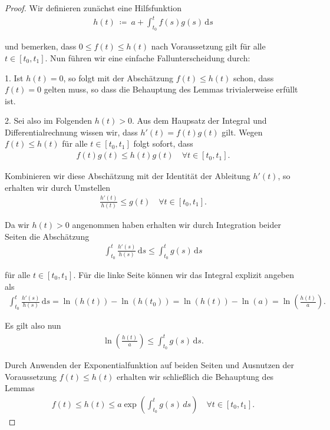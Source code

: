 \documentclass[letterpaper,10pt,english]{jupyterBook}
\begin{document}
\begin{proof}
 Wir definieren zunächst eine Hilfsfunktion
\begin{align*}
h(t) \ \coloneqq \ a + \int_{t_0}^t f(s)g(s)\, \mathrm{d}s
\end{align*}
\par
und bemerken, dass \(0 \leq f(t) \leq h(t)\) nach Voraussetzung gilt für alle \(t \in [t_0, t_1]\).
Nun führen wir eine einfache Fallunterscheidung durch:

\par
1. Ist \(h(t)=0\), so folgt mit der Abschätzung \(f(t) \leq h(t)\) schon, dass \(f(t) = 0\) gelten muss, so dass die Behauptung des Lemmas trivialerweise erfüllt ist.

\par
2. Sei also im Folgenden \(h(t) > 0\).
Aus dem Haupsatz der Integral  und Differentialrechnung wissen wir, dass \(h'(t) = f(t)g(t)\) gilt.
Wegen \(f(t) \leq h(t)\) für alle \(t \in [t_0, t_1]\) folgt sofort, dass
\begin{align*}
f(t)g(t) \leq h(t)g(t) \quad \forall t \in [t_0,t_1].
\end{align*}
\par
Kombinieren wir diese Abschätzung mit der Identität der Ableitung \(h'(t)\), so erhalten wir durch Umstellen
\begin{align*}
\frac{h'(t)}{h(t)} \leq g(t) \quad \forall t \in [t_0, t_1].
\end{align*}
\par
Da wir \(h(t) > 0\) angenommen haben erhalten wir durch Integration beider Seiten die Abschätzung
\begin{align*}
\int_{t_0}^t \frac{h'(s)}{h(s)} \, \mathrm{d}s \leq \int_{t_0}^t g(s) \, \mathrm{d}s\end{align*}
\par
für alle \(t \in [t_0, t_1]\).
Für die linke Seite können wir das Integral explizit angeben als
\begin{align*}
\int_{t_0}^t \frac{h'(s)}{h(s)} \, \mathrm{d}s = \ln(h(t)) - \ln(h(t_0)) = \ln(h(t)) - \ln(a) = \ln\left(\frac{h(t)}{a}\right).
\end{align*}
\par
Es gilt also nun
\begin{align*}
\ln \left(\frac{h(t)}{a}\right) \leq \int_{t_0}^t g(s)\, \mathrm{d}s.
\end{align*}
\par
Durch Anwenden der Exponentialfunktion auf beiden Seiten und Ausnutzen der Voraussetzung \(f(t) \leq h(t)\) erhalten wir schließlich die Behauptung des Lemmas
\begin{align*}
 f(t) \leq h(t)\leq a \exp{\left( \int_{t_0}^t g(s)\, ds \right)} \quad \forall t \in [t_0,t_1].
\end{align*}\end{proof}
\end{document}
